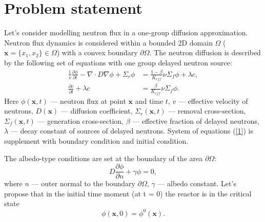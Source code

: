\documentclass[runningheads]{llncs}
\begin{document}
\section{Problem statement}
Let's consider modelling neutron flux in a one-group diffusion approximation. 
Neutron flux dynamics is considered within a bounded 2D domain  $\Omega$ ($\bm x = \{x_1, x_2\} \in \Omega$) with a convex boundary $\partial \Omega$. 
The neutron diffusion is described by the following set of equations with one group delayed neutron source:
\begin{equation}\label{1}
\begin{split}
 \frac{1}{v} \frac{\partial \phi}{\partial t} - \nabla \cdot D \nabla \phi + \Sigma_r \phi &= \frac{1 - \beta}{K_{eff}} \nu \Sigma_f \phi + \lambda c, \\
\frac{\partial c}{\partial t} + \lambda c &= \frac{\beta}{K_{eff}} \nu \Sigma_f \phi.
\end{split}
\end{equation} 
Here $\phi(\bm x,t)$ --- neutron flux  at point $\bm x$ and time $t$,
$v$ --- effective velocity of neutrons,
$D(\bm x)$ --- diffusion coefficient, 
$\Sigma_r(\bm x,t)$ --- removal cross-section,
$\Sigma_f(\bm x,t)$ --- generation cross-section,
$\beta$ --- effective fraction of delayed neutrons, 
$\lambda$ --- decay constant of sources of delayed neutrons.
System of equations (\ref{1}) is supplement with boundary condition and  initial condition.

The albedo-type conditions are set at the boundary of the area $\partial \Omega$:
\begin{equation}\label{2}
 D\frac{\partial \phi}{\partial n} + \gamma \phi = 0,
\end{equation} 
where $n$ --- outer normal to the boundary $\partial \Omega$, $\gamma$ --- albedo constant.
Let's propose that in the initial time moment (at t = 0) the reactor is in the critical state
\begin{equation}\label{3}
 \phi(\bm x,0) = \phi^0(\bm x).
\end{equation} 
\end{document}
